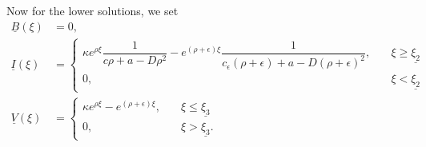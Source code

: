 \documentclass[11pt]{article}
\theoremstyle{definition}
\begin{document}
Now for the lower solutions,
we set 
\begin{align}\label{lowersolutions2}
  \nonumber  \underline{B}(\xi)& =
   0, \\ \underline{I}(\xi) &=
    \begin{cases}
       \kappa e^{\rho \xi} \dfrac{1}{c \rho +a - D \rho^2}-e^{(\rho+ \epsilon)\xi}\dfrac{1}{c_\epsilon (\rho+\epsilon)+a-D (\rho+\epsilon)^2 }, \nonumber & \quad \xi \geq \underline{\xi_2} \\ 
        0, & \quad \xi < \underline{\xi_2}
    \end{cases}\\ \underline{V}(\xi)& =
    \begin{cases}
        \kappa e^{\rho \xi}-e^{(\rho+ \epsilon)\xi}, & \quad \xi \leq \underline{\xi_3} \\ 
       0, & \quad \xi >\underline{\xi_3}. 
    \end{cases}
\end{align}
\end{document}
